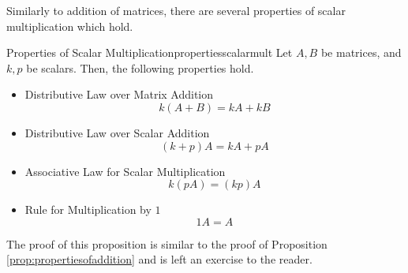 Similarly to addition of matrices, there are several properties of scalar multiplication which hold.

\begin{proposition}{Properties of Scalar Multiplication}{propertiesscalarmult}
Let $A, B$ be matrices, and $k, p$ be scalars. Then, the following properties  hold.
\begin{itemize}
\item Distributive Law over Matrix Addition
\begin{equation*}
k \left( A+B\right) =k A+ kB  
\end{equation*}

\item Distributive Law over Scalar Addition
\begin{equation*}
\left( k +p \right) A= k A+p A
\end{equation*}

\item Associative Law for Scalar Multiplication
\begin{equation*}
k \left( p A\right) = \left( k p \right) A 
\end{equation*}

\item Rule for Multiplication by $1$
\begin{equation*}
1A=A  
\end{equation*}
\end{itemize}

\end{proposition}

The proof of this proposition is similar to the proof of Proposition \ref{prop:propertiesofaddition} and is left an exercise to the reader.